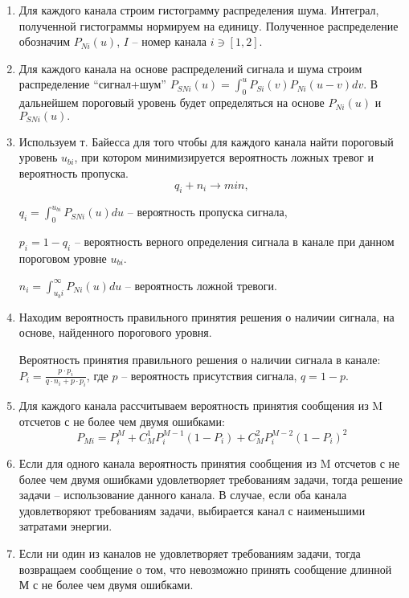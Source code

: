 \begin{enumerate}
    \item Для каждого канала строим гистограмму распределения шума. Интеграл, полученной гистограммы нормируем на единицу. Полученное распределение обозначим $P_{Ni} (u)$, $I$ – номер канала $i \ni [1, 2]$.
    \item Для каждого канала на основе распределений сигнала и шума строим распределение “сигнал+шум” $P_{SNi} (u)=\int_0^uP_{Si}(v) P_{Ni}(u-v)dv$. В дальнейшем пороговый уровень будет определяться на основе $P_{Ni} (u)$ и $P_{SNi} (u).$
    \item Используем т. Байесса для того чтобы для каждого канала найти пороговый уровень $u_{bi}$, при котором минимизируется вероятность ложных тревог и вероятность пропуска.
    $$q_i+n_i \rightarrow min,$$
    
    $q_i=\int_0^{u_{bi}}P_{SNi}(u)du$ – вероятность пропуска сигнала,

    $p_i=1- q_i$ – вероятность верного определения сигнала в канале при данном пороговом уровне $u_{bi}$.
    
    $n_i=\int_{u_bi}^\infty P_{Ni}(u)du$ – вероятность ложной тревоги.

	\item Находим вероятность правильного принятия решения о наличии сигнала, на основе, найденного порогового уровня.
    
    Вероятность принятия правильного решения о наличии сигнала в канале:  $P_i=\frac{p \cdot p_i}{q \cdot n_i+p \cdot p_i }$, где $p$ – вероятность присутствия сигнала, $q =1-p$.
    \item Для каждого канала рассчитываем вероятность принятия сообщения из M отсчетов с не более чем двумя ошибками:
    $$P_{Mi}=P_i^M+C_M^1 P_i^{M-1} (1-P_i )+C_M^2 P_i^{M-2} (1-P_i)^2$$
    \item Если для одного канала вероятность принятия сообщения из M отсчетов с не более чем двумя ошибками удовлетворяет требованиям задачи, тогда решение задачи – использование данного канала. В случае, если оба канала удовлетворяют требованиям задачи, выбирается канал с наименьшими затратами энергии.
    \item Если ни один из каналов не удовлетворяет требованиям задачи, тогда возвращаем сообщение о том, что невозможно принять сообщение длинной М с не более чем двумя ошибками.
\end{enumerate}